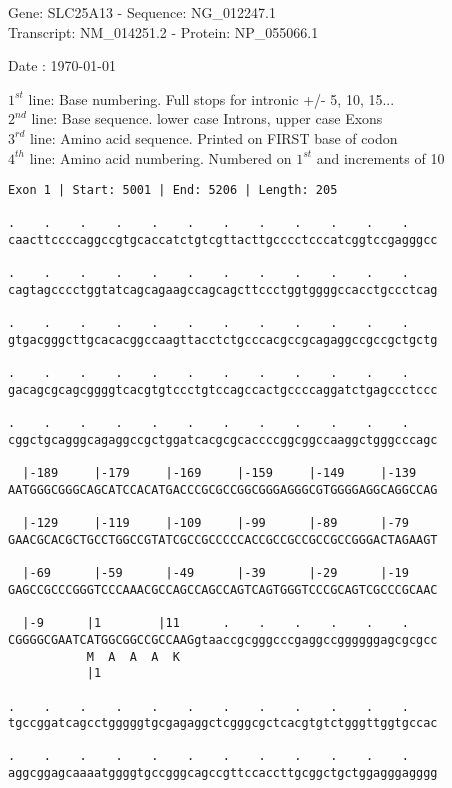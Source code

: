 \documentclass{article}
\begin{document}
\begin{center}
\begin{large}
Gene: SLC25A13 - Sequence: NG\_012247.1\\
Transcript: NM\_014251.2 - Protein: NP\_055066.1
 
 Date : \today
\end{large}
\end{center}
$1^{st}$ line: Base numbering. Full stops for intronic +/- 5, 10, 15...\\
$2^{nd}$ line: Base sequence. lower case Introns, upper case Exons\\
$3^{rd}$ line: Amino acid sequence. Printed on FIRST base of codon\\
$4^{th}$ line: Amino acid numbering. Numbered on $1^{st}$ and increments of 10\\
\begin{Verbatim}[fontfamily=courier]
Exon 1 | Start: 5001 | End: 5206 | Length: 205

.    .    .    .    .    .    .    .    .    .    .    .    
caacttccccaggccgtgcaccatctgtcgttacttgcccctcccatcggtccgagggcc

.    .    .    .    .    .    .    .    .    .    .    .    
cagtagcccctggtatcagcagaagccagcagcttccctggtggggccacctgccctcag

.    .    .    .    .    .    .    .    .    .    .    .    
gtgacgggcttgcacacggccaagttacctctgcccacgccgcagaggccgccgctgctg

.    .    .    .    .    .    .    .    .    .    .    .    
gacagcgcagcggggtcacgtgtccctgtccagccactgccccaggatctgagccctccc

.    .    .    .    .    .    .    .    .    .    .    .    
cggctgcagggcagaggccgctggatcacgcgcaccccggcggccaaggctgggcccagc

  |-189     |-179     |-169     |-159     |-149     |-139   
AATGGGCGGGCAGCATCCACATGACCCGCGCCGGCGGGAGGGCGTGGGGAGGCAGGCCAG

  |-129     |-119     |-109     |-99      |-89      |-79    
GAACGCACGCTGCCTGGCCGTATCGCCGCCCCCACCGCCGCCGCCGCCGGGACTAGAAGT

  |-69      |-59      |-49      |-39      |-29      |-19    
GAGCCGCCCGGGTCCCAAACGCCAGCCAGCCAGTCAGTGGGTCCCGCAGTCGCCCGCAAC

  |-9      |1        |11      .    .    .    .    .    .    
CGGGGCGAATCATGGCGGCCGCCAAGgtaaccgcgggcccgaggccggggggagcgcgcc
           M  A  A  A  K                                    
           |1                                               

.    .    .    .    .    .    .    .    .    .    .    .    
tgccggatcagcctgggggtgcgagaggctcgggcgctcacgtgtctgggttggtgccac

.    .    .    .    .    .    .    .    .    .    .    .    
aggcggagcaaaatggggtgccgggcagccgttccaccttgcggctgctggagggagggg

\end{Verbatim}
\end{document}
